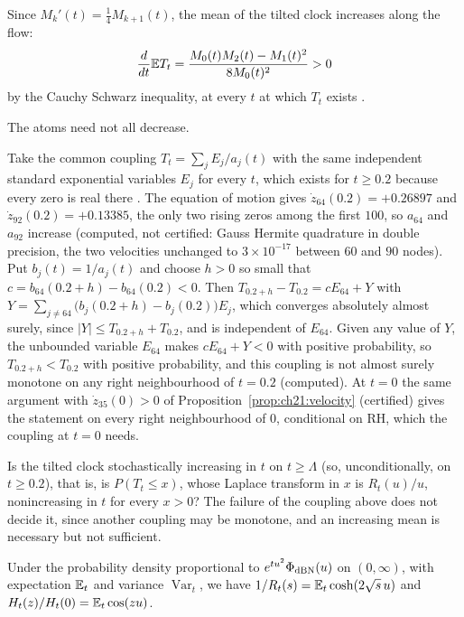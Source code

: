 \begin{resultpar}\label{res:ch21:meanup}Since $M_k'(t)=\frac14M_{k+1}(t)$, the mean of the tilted clock increases along the flow:
\[
\frac d{dt}\mathbb{E} T_t=\frac{M_0(t)M_2(t)-M_1(t)^2}{8M_0(t)^2}>0
\]
by the Cauchy Schwarz inequality, at every $t$ at which $T_t$ exists \cite{P26pg3}.\end{resultpar} The atoms need not all decrease. \begin{resultpar}\label{res:ch21:coupling}Take the common coupling $T_t=\sum_jE_j/a_j(t)$ with the same independent standard exponential variables $E_j$ for every $t$, which exists for $t\ge0.2$ because every zero is real there \cite{PT21}. The equation of motion gives $\dot z_{64}(0.2)=+0.26897$ and $\dot z_{92}(0.2)=+0.13385$, the only two rising zeros among the first $100$, so $a_{64}$ and $a_{92}$ increase (computed, not certified: Gauss Hermite quadrature in double precision, the two velocities unchanged to $3\times10^{-17}$ between $60$ and $90$ nodes). Put $b_j(t)=1/a_j(t)$ and choose $h>0$ so small that $c=b_{64}(0.2+h)-b_{64}(0.2)<0$. Then $T_{0.2+h}-T_{0.2}=cE_{64}+Y$ with $Y=\sum_{j\ne64}\big(b_j(0.2+h)-b_j(0.2)\big)E_j$, which converges absolutely almost surely, since $|Y|\le T_{0.2+h}+T_{0.2}$, and is independent of $E_{64}$. Given any value of $Y$, the unbounded variable $E_{64}$ makes $cE_{64}+Y<0$ with positive probability, so $T_{0.2+h}<T_{0.2}$ with positive probability, and this coupling is not almost surely monotone on any right neighbourhood of $t=0.2$ (computed). At $t=0$ the same argument with $\dot z_{35}(0)>0$ of Proposition~\ref{prop:ch21:velocity} (certified) gives the statement on every right neighbourhood of $0$, conditional on RH, which the coupling at $t=0$ needs.\end{resultpar}

\begin{problem}\label{prob:ch21:order}
Is the tilted clock stochastically increasing in $t$ on $t\ge\Lambda$ (so, unconditionally, on $t\ge0.2$), that is, is $P(T_t\le x)$, whose Laplace transform in $x$ is $R_t(u)/u$, nonincreasing in $t$ for every $x>0$? The failure of the coupling above does not decide it, since another coupling may be monotone, and an increasing mean is necessary but not sufficient.
\end{problem}

Under the probability density proportional to $e^{tu^2}\Phi_{\rm dBN}(u)$ on $(0,\infty)$, with expectation $\mathbb{E}_t$ and variance $\operatorname{Var}_t$, we have $1/R_t(s)=\mathbb{E}_t\cosh(2\sqrt{s}\,u)$ and $H_t(z)/H_t(0)=\mathbb{E}_t\cos(zu)$.

